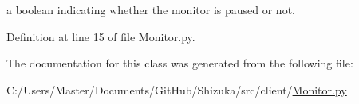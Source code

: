 a boolean indicating whether the monitor is paused or not. 



Definition at line 15 of file Monitor.\-py.



The documentation for this class was generated from the following file\-:\begin{DoxyCompactItemize}
\item 
C\-:/\-Users/\-Master/\-Documents/\-Git\-Hub/\-Shizuka/src/client/\hyperlink{_monitor_8py}{Monitor.\-py}\end{DoxyCompactItemize}
